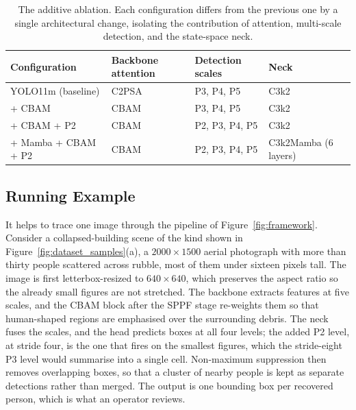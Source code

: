 \begin{table}[tbp]
  \centering
  \caption{The additive ablation. Each configuration differs from the previous one
  by a single architectural change, isolating the contribution of attention,
  multi-scale detection, and the state-space neck.}
  \label{tab:variants}
  \begin{tabular}{@{}l l l l@{}}
    \toprule
    Configuration & Backbone attention & Detection scales & Neck \\
    \midrule
    YOLO11m (baseline)   & C2PSA            & P3, P4, P5         & C3k2 \\
    + CBAM               & CBAM             & P3, P4, P5         & C3k2 \\
    + CBAM + P2          & CBAM             & P2, P3, P4, P5     & C3k2 \\
    + Mamba + CBAM + P2  & CBAM             & P2, P3, P4, P5     & C3k2Mamba (6 layers) \\
    \bottomrule
  \end{tabular}
\end{table}

\subsection{Running Example}
It helps to trace one image through the pipeline of Figure~\ref{fig:framework}.
Consider a collapsed-building scene of the kind shown in
Figure~\ref{fig:dataset_samples}(a), a $2000\times1500$ aerial photograph with more
than thirty people scattered across rubble, most of them under sixteen pixels tall.
The image is first letterbox-resized to $640\times640$, which preserves the aspect
ratio so the already small figures are not stretched. The backbone extracts features
at five scales, and the CBAM block after the SPPF stage re-weights them so that
human-shaped regions are emphasised over the surrounding debris. The neck fuses the
scales, and the head predicts boxes at all four levels; the added P2 level, at
stride four, is the one that fires on the smallest figures, which the stride-eight
P3 level would summarise into a single cell. Non-maximum suppression then removes
overlapping boxes, so that a cluster of nearby people is kept as separate detections
rather than merged. The output is one bounding box per recovered person, which is
what an operator reviews.


